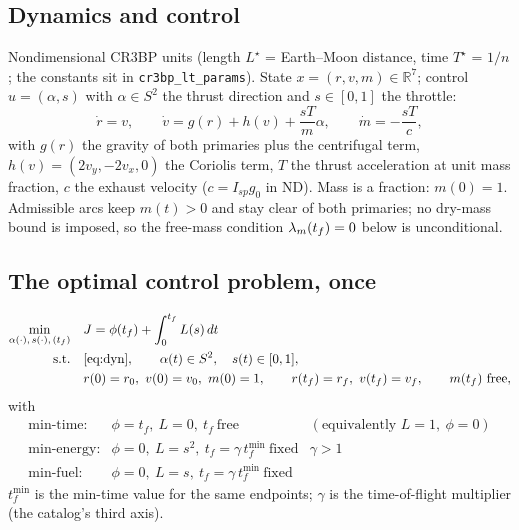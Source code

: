 \documentclass[11pt]{article}
\newcommand{\tf}{t_f}\newcommand{\R}{\mathbb{R}}
\newcommand{\file}[1]{\texttt{#1}}
\begin{document}
\subsection{Dynamics and control}
Nondimensional CR3BP units (length $L^\star$ = Earth--Moon distance, time
$T^\star$ = $1/n$; the constants sit in \file{cr3bp\_lt\_params}). State
$x=(r,v,m)\in\R^7$; control $u=(\alpha,s)$ with $\alpha\in S^2$ the thrust
direction and $s\in[0,1]$ the throttle:
\begin{equation}\label{eq:dyn}
\dot r = v,\qquad
\dot v = g(r) + h(v) + \frac{sT}{m}\alpha,\qquad
\dot m = -\frac{sT}{c},
\end{equation}
with $g(r)$ the gravity of both primaries plus the centrifugal term,
$h(v)=(2v_y,-2v_x,0)$ the Coriolis term, $T$ the thrust acceleration at unit
mass fraction, $c$ the exhaust velocity ($c = I_{sp}g_0$ in ND). Mass is a
fraction: $m(0)=1$. Admissible arcs keep $m(t)>0$ and stay clear of both primaries; no dry-mass bound is imposed, so the free-mass condition $\lm(\tf)=0$ below is unconditional.

\subsection{The optimal control problem, once}
\begin{rig}
\begin{align}
\min_{\alpha(\cdot),\,s(\cdot),\,(\tf)}\quad & J = \phi(\tf) + \int_0^{\tf} L(s)\,dt \label{eq:J}\\
\text{s.t.}\quad & \eqref{eq:dyn},\qquad \alpha(t)\in S^2,\quad s(t)\in[0,1],\notag\\
& r(0)=r_0,\ v(0)=v_0,\ m(0)=1,\qquad r(\tf)=r_f,\ v(\tf)=v_f,\qquad m(\tf)\ \text{free},\notag
\end{align}
with
\[
\begin{array}{lll}
\text{min-time:}   & \phi=\tf,\ L=0,\ \tf\ \text{free} & (\text{equivalently } L=1,\ \phi=0)\\
\text{min-energy:} & \phi=0,\ L=s^2,\ \tf=\gamma\,\tf^{\min}\ \text{fixed} & \gamma>1\\
\text{min-fuel:}   & \phi=0,\ L=s,\ \tf=\gamma\,\tf^{\min}\ \text{fixed} &
\end{array}
\]
$\tf^{\min}$ is the min-time value for the same endpoints; $\gamma$ is the
time-of-flight multiplier (the catalog's third axis).
\end{rig}
\end{document}
